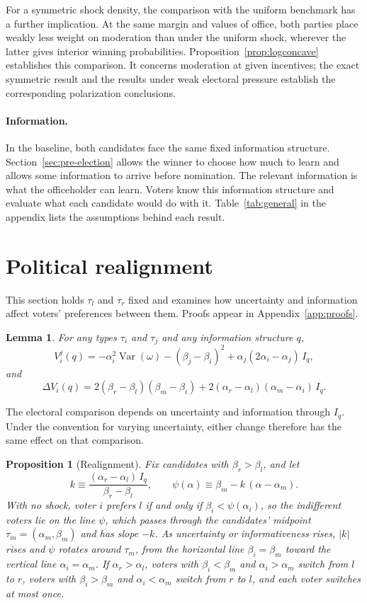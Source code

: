 \documentclass[12pt,letterpaper]{article}
\newtheorem{proposition}{Proposition}
\newtheorem{lemma}{Lemma}
\begin{document}
For a symmetric shock density, the comparison with the uniform benchmark has a further implication. At the same margin and values of office, both parties place weakly less weight on moderation than under the uniform shock, wherever the latter gives interior winning probabilities. Proposition~\ref{prop:logconcave} establishes this comparison. It concerns moderation at given incentives; the exact symmetric result and the results under weak electoral pressure establish the corresponding polarization conclusions.

\paragraph{Information.}
In the baseline, both candidates face the same fixed information structure. Section~\ref{sec:pre-election} allows the winner to choose how much to learn and allows some information to arrive before nomination. The relevant information is what the officeholder can learn. Voters know this information structure and evaluate what each candidate would do with it. Table~\ref{tab:general} in the appendix lists the assumptions behind each result.

\section{Political realignment}\label{sec:realign}

This section holds $\tau_l$ and $\tau_r$ fixed and examines how uncertainty and information affect voters' preferences between them. Proofs appear in Appendix~\ref{app:proofs}.

\begin{lemma}\label{lem:payoff}
For any types $\tau_i$ and $\tau_j$ and any information structure $q$,
\[
V_i^j(q)=-\alpha_i^2\operatorname{Var}(\omega)-(\beta_j-\beta_i)^2+\alpha_j(2\alpha_i-\alpha_j)\,I_q,
\]
and
\[
\Delta V_i(q)=2(\beta_r-\beta_l)(\beta_m-\beta_i)+2(\alpha_r-\alpha_l)(\alpha_m-\alpha_i)\,I_q.
\]
\end{lemma}

The electoral comparison depends on uncertainty and information through $I_q$. Under the convention for varying uncertainty, either change therefore has the same effect on that comparison.

\begin{proposition}[Realignment]\label{prop:realign}
Fix candidates with $\beta_r>\beta_l$, and let
\[
k\equiv\frac{(\alpha_r-\alpha_l)\,I_q}{\beta_r-\beta_l},
\qquad
\psi(\alpha)\equiv\beta_m-k\,(\alpha-\alpha_m).
\]
With no shock, voter $i$ prefers $l$ if and only if $\beta_i<\psi(\alpha_i)$, so the indifferent voters lie on the line $\psi$, which passes through the candidates' midpoint $\tau_m=(\alpha_m,\beta_m)$ and has slope $-k$. As uncertainty or informativeness rises, $|k|$ rises and $\psi$ rotates around $\tau_m$, from the horizontal line $\beta_i=\beta_m$ toward the vertical line $\alpha_i=\alpha_m$. If $\alpha_r>\alpha_l$, voters with $\beta_i<\beta_m$ and $\alpha_i>\alpha_m$ switch from $l$ to $r$, voters with $\beta_i>\beta_m$ and $\alpha_i<\alpha_m$ switch from $r$ to $l$, and each voter switches at most once.
\end{proposition}
\end{document}
